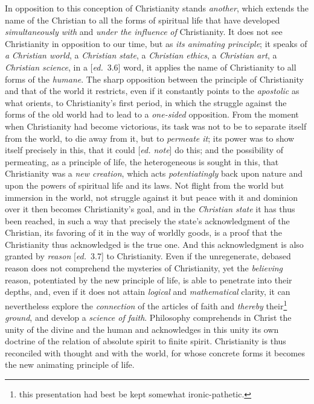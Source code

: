 \documentclass[12pt,a4paper,openany]{book}
\newcommand{\kpage}[1]{\marginnote{\footnotesize\textit{[#1]}}}
\newcommand{\ed}[1]{{\small[\textit{ed.}\ #1]}}
\newcommand{\ednote}[1]{{\small[\textit{ed. note}]}}
\begin{document}
In opposition to this conception of Christianity stands
\emph{another}, which extends the name of the Christian to all the forms
of spiritual life that have developed \emph{simultaneously with} and \emph{under the influence}
\emph{of} Christianity. It does not see Christianity in opposition
to our time, but as \emph{its animating principle}; it speaks of \emph{a}
\emph{Christian world}, a \emph{Christian state}, a \emph{Christian ethics}, a \emph{Christian art}, a
\emph{Christian science}, in a \ed{3.6} word, it applies the name of Christianity
to all forms of the \emph{humane}. The sharp opposition
between the principle of Christianity and that of the world it restricts,
even if it constantly points to the \emph{apostolic} as what orients,
to Christianity's first period, in which the struggle against
the forms of the old world had to lead to a \emph{one-sided} opposition.
From the moment when Christianity had become victorious,
its task was not to be to separate itself from the world, to die away from it,
but to \emph{permeate it}; its power was to show itself precisely in this, that it
could
\ednote{}
do this; and the possibility of permeating, as a principle of life, the
heterogeneous is sought in this, that Christianity was a \emph{new creation}, which
acts \emph{potentiatingly} back upon nature and upon the powers of spiritual life
and its laws. Not flight from the world but immersion in the world, not
struggle against it but peace with it and dominion over it then becomes
Christianity's goal, and in the \emph{Christian state} it has thus been
reached, in such a way that precisely the state's acknowledgment of the Christian, its
favoring of it in the way of worldly goods, is a proof that
\kpage{85}the Christianity thus acknowledged is the true one. And this
acknowledgment is also granted by \emph{reason} \ed{3.7} to Christianity. Even if
the unregenerate, debased reason does not comprehend the mysteries of Christianity,
yet the \emph{believing} reason, potentiated by the new principle of life,
is able to penetrate into their depths, and, even if
it does not attain \emph{logical} and \emph{mathematical} clarity, it can nevertheless
explore the \emph{connection} of the articles of faith and \emph{thereby} their\footnote[10]{this presentation had best be kept somewhat ironic-pathetic.}
\emph{ground}, and
develop a \emph{science of faith}. Philosophy comprehends in Christ the unity
of the divine and the human and acknowledges in this unity
its own doctrine of the relation of absolute spirit to finite spirit.
Christianity is thus reconciled with thought and with the world,
for whose concrete forms it becomes the new animating principle of life.
\end{document}
